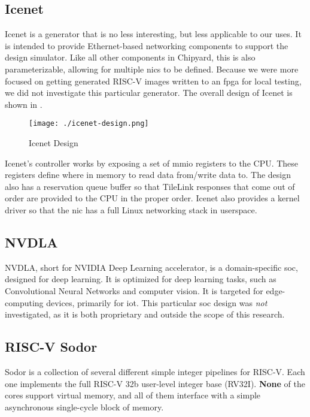 \subsection{Icenet}\label{sec:Icenet_Generator}
\nocite{icenetGithub}
Icenet is a \gls{generator} that is no less interesting, but less applicable to our uses.
It is intended to provide Ethernet-based networking components to support the  design simulator.
Like all other components in Chipyard, this is also parameterizable, allowing for multiple \Glspl{nic} to be defined.
Because we were more focused on getting generated RISC-V images written to an \Gls{fpga} for local testing, we did not investigate this particular generator.
The overall design of Icenet is shown in .

\begin{figure}[h!tbp]
  \centering
  \texttt{[image: ./icenet-design.png]}
  \caption{Icenet Design}
  \label{fig:Icenet_Generator}
\end{figure}

Icenet's controller works by exposing a set of \gls{mmio} registers to the CPU.\@
These registers define where in memory to read data from/write data to.
The design also has a reservation queue buffer so that TileLink responses that come out of order are provided to the CPU in the proper order.
Icenet also provides a kernel driver so that the \gls{nic} has a full Linux networking stack in userspace.

\subsection{NVDLA}\label{sec:NVDLA_Generator}
\nocite{nvdlaPaper}
\nocite{nvdlaNVIDIAPresentation}
NVDLA, short for NVIDIA Deep Learning \Gls{accelerator}, is a domain-specific \gls{soc}, designed for deep learning.
It is optimized for deep learning tasks, such as Convolutional Neural Networks and computer vision.
It is targeted for edge-computing devices, primarily for \Gls{iot}.
This particular \gls{soc} design was \emph{not} investigated, as it is both proprietary and outside the scope of this research.

\subsection{RISC-V Sodor}\label{sec:RISC-V_Sodor}
\nocite{sodorGithub}
Sodor is a collection of several different simple integer pipelines for RISC-V.
Each one implements the full RISC-V 32b user-level integer base (RV32I).
\textbf{None} of the cores support virtual memory, and all of them interface with a simple asynchronous single-cycle block of memory.

